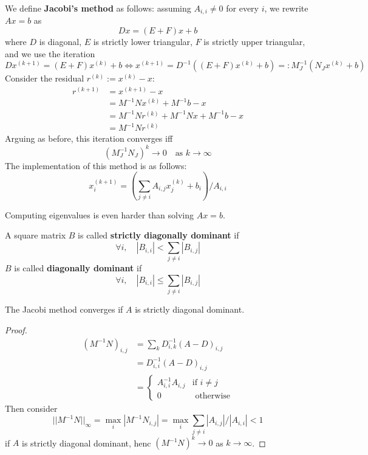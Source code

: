 \begin{definition}
	We define \textbf{Jacobi's method} as follows: assuming $A_{i, i} \ne 0$ for every $i$, we rewrite $Ax = b$ as
	\[
		Dx = (E + F)x + b
	\]
	where $D$ is diagonal, $E$ is strictly lower triangular, $F$ is strictly upper triangular, and we use the iteration
	\[
		D x^{(k + 1)} = (E + F) x^{(k)} + b \Longleftrightarrow x^{(k + 1)} = D^{-1} ( (E + F) x^{(k)} + b) =: M_J^{-1} (N_J x^{(k)} + b)
	\]
	Consider the residual $r^{(k)} := x^{(k)} - x$:
	\[
		\begin{aligned}
			r^{(k + 1)}
				& = x^{(k + 1)} - x \\
				& = M^{-1} N x^{(k)} + M^{-1} b - x \\
				& = M^{-1} N r^{(k)} + M^{-1} N x + M^{-1} b - x \\
				& = M^{-1} N r^{(k)}
		\end{aligned}
	\]
	Arguing as before, this iteration converges iff
	\[
		{(M_J^{-1} N_J)}^k \to 0 \quad \text{as } k \to \infty
	\]
	The implementation of this method is as follows:
	\[
		x_i^{(k + 1)} = \left( \sum_{j \ne i} A_{i, j} x_j^{(k)} + b_i \right) / A_{i, i}
	\]
\end{definition}

\begin{remark}
	Computing eigenvalues is even harder than solving $Ax = b$.
\end{remark}

\begin{definition}
	A square matrix $B$ is called \textbf{strictly diagonally dominant} if
	\[
		\forall i, \quad |B_{i, i}| < \sum_{j \ne i} |B_{i, j}|
	\]
	$B$ is called \textbf{diagonally dominant} if
	\[
		\forall i, \quad |B_{i, i}| \le \sum_{j \ne i} |B_{i, j}|
	\]
\end{definition}

\begin{proposition}
	The Jacobi method converges if $A$ is strictly diagonal dominant.
\end{proposition}

\begin{proof}
	\[
		\begin{aligned}
			{(M^{-1} N)}_{i, j}
				& = \sum_k D_{i, k}^{-1} {(A - D)}_{i, j} \\
				& = D_{i, i}^{-1} {(A - D)}_{i, j} \\
				& = \begin{cases}
					A_{i, i}^{-1} A_{i, j} & \text{if } i \ne j \\
					0 & \text{ otherwise}
				\end{cases}
		\end{aligned}
	\]
	Then consider
	\[
		||M^{-1} N||_{\infty} = \max_i |M^{-1} N_{i, j}| = \max_i \sum_{j \ne i} |A_{i, j}| / |A_{i, i}| < 1
	\]
	if $A$ is strictly diagonal dominant, henc ${(M^{-1} N)}^k \to 0$ as $k \to \infty$.
\end{proof}

